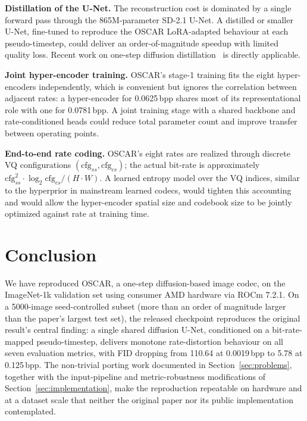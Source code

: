 \documentclass[conference]{IEEEtran}
\begin{document}
\textbf{Distillation of the U-Net.} The reconstruction cost is dominated
by a single forward pass through the 865M-parameter SD-2.1 U-Net. A
distilled or smaller U-Net, fine-tuned to reproduce the OSCAR
LoRA-adapted behaviour at each pseudo-timestep, could deliver an
order-of-magnitude speedup with limited quality loss. Recent work on
one-step diffusion distillation~\cite{vpred} is directly applicable.

\textbf{Joint hyper-encoder training.} OSCAR's stage-1 training fits the
eight hyper-encoders independently, which is convenient but ignores the
correlation between adjacent rates: a hyper-encoder for 0.0625\,bpp
shares most of its representational role with one for 0.0781\,bpp. A
joint training stage with a shared backbone and rate-conditioned heads
could reduce total parameter count and improve transfer between
operating points.

\textbf{End-to-end rate coding.} OSCAR's eight rates are realized through
discrete VQ configurations $(\text{cfg}_{ss}, \text{cfg}_{cs})$; the
actual bit-rate is approximately $\text{cfg}_{ss}^2 \cdot \log_2 \text{cfg}_{cs} / (H \cdot W)$.
A learned entropy model over the VQ indices, similar to the hyperprior
in mainstream learned codecs, would tighten this accounting and would
allow the hyper-encoder spatial size and codebook size to be jointly
optimized against rate at training time.

\section{Conclusion}
\label{sec:conclusion}

We have reproduced OSCAR, a one-step diffusion-based image codec, on the
ImageNet-1k validation set using consumer AMD hardware via ROCm 7.2.1. On
a 5000-image seed-controlled subset (more than an order of magnitude
larger than the paper's largest test set), the released checkpoint
reproduces the original result's central finding: a single shared
diffusion U-Net, conditioned on a bit-rate-mapped pseudo-timestep,
delivers monotone rate-distortion behaviour on all seven evaluation
metrics, with FID dropping from 110.64 at 0.0019\,bpp to 5.78 at
0.125\,bpp. The non-trivial porting work documented in
Section~\ref{sec:problems}, together with the input-pipeline and
metric-robustness modifications of Section~\ref{sec:implementation},
make the reproduction repeatable on hardware and at a dataset scale that
neither the original paper nor its public implementation contemplated.
\end{document}
